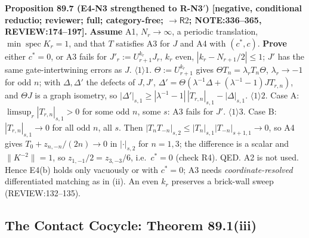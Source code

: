 \textbf{Proposition 89.7 (E4-N3 strengthened to R-N3\('\)) [negative, conditional reductio; reviewer; full;
category-free; \(\to\mathsf R2\); NOTE:336--365, REVIEW:174--197].}  \textbf{Assume} A1, \(N_r\to\infty\), a periodic
translation, \(\min\operatorname{spec}K_r=1\), and that \(T\) satisfies A3 for \(J\) and A4 with \((c^*,c)\).
\textbf{Prove} either \(c^*=0\), or A3 fails for \(J'_r:=U_{r+1}^{k_r}J_r\), \(k_r\) even, \(|k_r-N_{r+1}/2|\le1\); \(J'\)
has the same gate-intertwining errors as \(J\).
\(\langle1\rangle1\). \(\Theta:=U^{k_r}_{r+1}\) gives \(\Theta T_n=\lambda_rT_n\Theta\), \(\lambda_r\to-1\) for odd \(n\); with
\(\Delta,\Delta'\) the defects of \(J,J'\), \(\Delta'=\Theta(\lambda^{-1}\Delta+(\lambda^{-1}-1)JT_{r,n})\), and \(\Theta J\) is a graph
isometry, so \(|\Delta'|_{s,1}\ge|\lambda^{-1}-1|\,|T_{r,n}|_{s,1}-|\Delta|_{s,1}\).
\(\langle1\rangle2\). Case A: \(\limsup_r|T_{r,n}|_{s,1}>0\) for some odd \(n\), some \(s\): A3 fails for \(J'\).
\(\langle1\rangle3\). Case B: \(|T_{r,n}|_{s,1}\to0\) for all odd \(n\), all \(s\).  Then
\(|T_nT_{-n}|_{s,2}\le|T_n|_{s,1}|T_{-n}|_{s+1,1}\to0\), so A4 gives \(T_0+z_{n,-n}/(2n)\to0\) in \(|\cdot|_{s,2}\) for
\(n=1,3\); the difference is a scalar and \(\|K^{-2}\|=1\), so \(z_{1,-1}/2=z_{3,-3}/6\), i.e.\ \(c^*=0\) (check R4).  QED.
A2 is not used.  Hence E4(b) holds only vacuously or with \(c^*=0\); A3 needs \emph{coordinate-resolved}
differentiated matching as in (ii).  An even \(k_r\) preserves a brick-wall sweep (REVIEW:132--135).

\subsection{The Contact Cocycle: Theorem 89.1(iii)}

